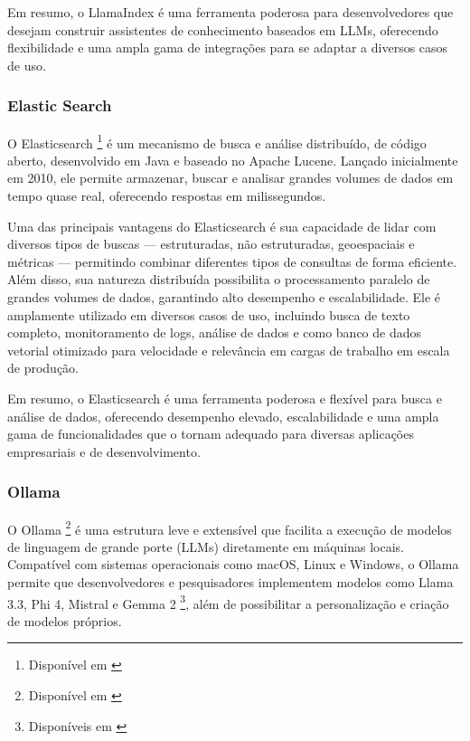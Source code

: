 \documentclass[a4paper, 12pt]{article}
\newcommand{\citeb}[1]{\bibleftbracket\cite{#1}\bibrightbracket}
\begin{document}
    Em resumo, o LlamaIndex é uma ferramenta poderosa para desenvolvedores que desejam construir assistentes de conhecimento baseados em LLMs, oferecendo flexibilidade e uma ampla gama de integrações para se adaptar a diversos casos de uso.

    \subsubsection{Elastic Search} \label{sec:elasticsearch}

    O Elasticsearch \footnote{Disponível em \citeb{elasticsearch}} é um mecanismo de busca e análise distribuído, de código aberto, desenvolvido em Java e baseado no Apache Lucene. Lançado inicialmente em 2010, ele permite armazenar, buscar e analisar grandes volumes de dados em tempo quase real, oferecendo respostas em milissegundos.

    Uma das principais vantagens do Elasticsearch é sua capacidade de lidar com diversos tipos de buscas — estruturadas, não estruturadas, geoespaciais e métricas — permitindo combinar diferentes tipos de consultas de forma eficiente. Além disso, sua natureza distribuída possibilita o processamento paralelo de grandes volumes de dados, garantindo alto desempenho e escalabilidade. Ele é amplamente utilizado em diversos casos de uso, incluindo busca de texto completo, monitoramento de logs, análise de dados e como banco de dados vetorial otimizado para velocidade e relevância em cargas de trabalho em escala de produção.

    Em resumo, o Elasticsearch é uma ferramenta poderosa e flexível para busca e análise de dados, oferecendo desempenho elevado, escalabilidade e uma ampla gama de funcionalidades que o tornam adequado para diversas aplicações empresariais e de desenvolvimento.

    \subsubsection{Ollama} \label{sec:ollama}

    O Ollama \footnote{Disponível em \citeb{ollama}} é uma estrutura leve e extensível que facilita a execução de modelos de linguagem de grande porte (LLMs) diretamente em máquinas locais. Compatível com sistemas operacionais como macOS, Linux e Windows, o Ollama permite que desenvolvedores e pesquisadores implementem modelos como Llama 3.3, Phi 4, Mistral e Gemma 2 \footnote{Disponíveis em \citeb{llama_models}}, além de possibilitar a personalização e criação de modelos próprios.
\end{document}
